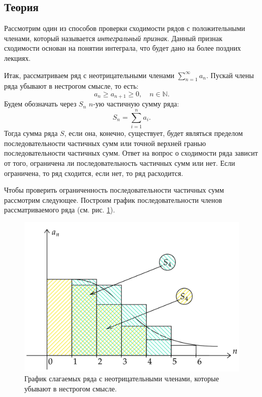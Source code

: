 \documentclass[12pt]{article}
\begin{document}
\subsection{Теория}
Рассмотрим один из способов проверки сходимости рядов с положительными членами, который называется \emph{интегральный признак}. Данный признак сходимости основан на понятии интеграла, что будет дано на более поздних лекциях.
\par
Итак, рассматриваем ряд с неотрицательными членами $\sum_{n=1}^\infty a_n$. Пускай члены ряда убывают в нестрогом смысле, то есть:
\begin{equation}
    a_{n} \ge a_{n+1} \ge 0, \quad n\in \mathbb{N}.
\end{equation}
Будем обозначать через $S_n$ $n$\--ую частичную сумму ряда:
\begin{equation}
    S_n = \sum\limits_{i=1}^n a_i.
\end{equation}
Тогда сумма ряда $S$, если она, конечно, существует, будет являться пределом последовательности частичных сумм или точной верхней гранью последовательности частичных сумм. Ответ на вопрос о сходимости ряда зависит от того, ограничена ли последовательность частичных сумм или нет. Если ограничена, то ряд сходится, если нет, то ряд расходится.
\par
Чтобы проверить ограниченность последовательности частичных сумм рассмотрим следующее. Построим график последовательности членов рассматриваемого ряда (см. рис. \ref{fig:7}).
\begin{figure}[ht]
    \centering
    \includegraphics[width = 1\textwidth]{Лекция 2/fig7.png}
    \caption{График слагаемых ряда с неотрицательными членами, которые убывают в нестрогом смысле.}
    \label{fig:7}
\end{figure}
\end{document}
